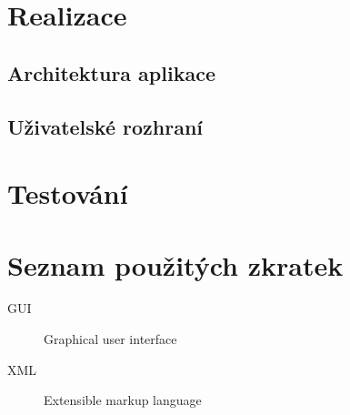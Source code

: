 \documentclass[thesis=B,czech]{FITthesis}[2012/06/26]
\begin{document}
\chapter{Realizace}

\section{Architektura aplikace}

\section{Uživatelské rozhraní}

\chapter{Testování}

\begin{conclusion}
\end{conclusion}




\appendix

\chapter{Seznam použitých zkratek}
\begin{description}
	\item[GUI] Graphical user interface
	\item[XML] Extensible markup language
\end{description}
\end{document}
